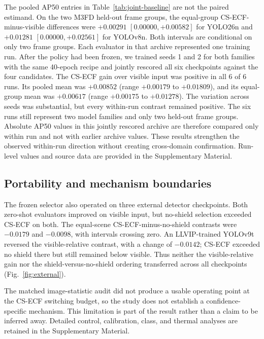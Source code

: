 \documentclass[preprint,11pt]{elsarticle}
\begin{document}
The pooled AP50 entries in Table~\ref{tab:joint-baseline} are not the paired
estimand. On the two M3FD held-out frame groups, the equal-group
CS-ECF-minus-visible differences were \(+0.00291\) \([0.00000,+0.00582]\) for
YOLO26n and \(+0.01281\) \([0.00000,+0.02561]\) for YOLOv8n. Both intervals
are conditional on only two frame groups. Each evaluator in that archive
represented one training run. After the policy had been frozen, we trained
seeds 1 and 2 for both families with the same 40-epoch recipe and jointly
rescored all six checkpoints against the four candidates. The CS-ECF gain over
visible input was positive in all 6 of 6 runs. Its pooled mean was \(+0.00852\)
(range \(+0.00179\) to \(+0.01809\)), and its equal-group mean was \(+0.00617\)
(range \(+0.00175\) to \(+0.01278\)). The variation across seeds was
substantial, but every within-run contrast remained positive. The six runs
still represent two model families and only two held-out frame groups. Absolute
AP50 values in this jointly rescored archive are therefore compared only within
run and not with earlier archive values. These results strengthen the observed
within-run direction without creating cross-domain confirmation.
Run-level values and source data are provided in the Supplementary Material.

\subsection{Portability and mechanism boundaries}

The frozen selector also operated on three external detector checkpoints.
Both zero-shot evaluators improved on visible input, but no-shield selection
exceeded CS-ECF on both. The equal-scene CS-ECF-minus-no-shield contrasts were
\(-0.0179\) and \(-0.0098\), with intervals crossing zero. An LLVIP-trained
YOLOv9t reversed the visible-relative contrast, with a change of \(-0.0142\);
CS-ECF exceeded no shield there but still remained below visible. Thus neither
the visible-relative gain nor the shield-versus-no-shield ordering transferred
across all checkpoints (Fig.~\ref{fig:external}).

The matched image-statistic audit did not produce a usable operating point at
the CS-ECF switching budget, so the study does not establish a
confidence-specific mechanism. This limitation is part of the result rather
than a claim to be inferred away. Detailed control, calibration, class, and
thermal analyses are retained in the Supplementary Material.
\end{document}
